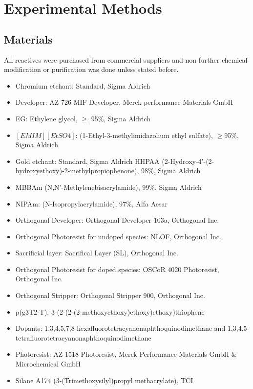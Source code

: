 {\chapter{Experimental Methods}}
\label{cha:2}

\section{Materials}
All reactives were purchased from commercial suppliers and non further chemical modification or purification was done unless stated before.

\begin{itemize}
\item Chromium etchant: Standard, Sigma Aldrich
\item Developer: AZ 726 MIF Developer, Merck performance Materials GmbH
\item EG: Ethylene glycol, $\geq$ 95$\%$, Sigma Aldrich
\item $[EMIM][EtSO4]$: (1-Ethyl-3-methylimidazolium ethyl sulfate), $\geq$95$\%$, Sigma Aldrich 
\item Gold etchant: Standard, Sigma Aldrich HHPAA (2-Hydroxy-4’-(2-hydroxyethoxy)-2-methylpropiophenone), 98$\%$, Sigma Aldrich 
\item MBBAm (N,N’-Methylenebisacrylamide), 99$\%$, Sigma Aldrich 
\item NIPAm: (N-Isopropylacrylamide), 97$\%$, Alfa Aesar 
\item Orthogonal Developer: Orthogonal Developer 103a, Orthogonal Inc. 
\item Orthogonal Photoresist for undoped species: NLOF, Orthogonal Inc.
\item Sacrificial layer: Sacrifical Layer (SL), Orthogonal Inc.
\item Orthogonal Photoresist for doped species: OSCoR 4020 Photoresist, Orthogonal Inc.
\item Orthogonal Stripper: Orthogonal Stripper 900, Orthogonal Inc. 
\item p(g3T2-T): 3-(2-(2-(2-methoxyethoxy)ethoxy)ethoxy)thiophene
\item Dopants: 1,3,4,5,7,8-hexafluorotetracyanonaphthoquinodimethane and 1,3,4,5-tetrafluorotetracyanonaphthoquinodimethane
\item Photoresist: AZ 1518 Photoresist, Merck Performance Materials GmbH \& Microchemical GmbH 
\item Silane A174 (3-(Trimethoxysilyl)propyl methacrylate), TCI

\end{itemize}

